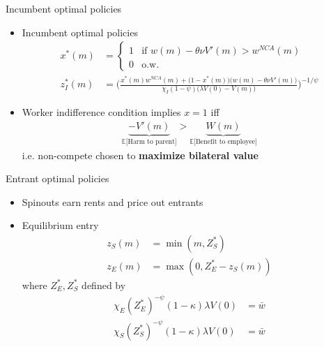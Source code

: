 \documentclass[english,usenames,dvipsnames]{beamer}
\begin{document}
\begin{frame}{Incumbent optimal policies}
\begin{itemize}
\item Incumbent optimal policies
\small
\begin{align*}
x^*(m) &= 
\begin{cases}
1 & \textrm{if } w(m) - \theta \nu V'(m) > w^{NCA}(m) \\
0 & \textrm{o.w.}
\end{cases}\\ 
z_I^*(m) &= \Bigg( \frac{x^*(m) w^{NCA}(m) + \Big(1-x^*(m)\Big) \Big(w(m) - \theta \nu V'(m)\Big)}{\chi_I (1-\psi) \Big(\lambda V(0) - V(m) \Big)} \Bigg)^{-1/\psi} 
\end{align*}
\normalsize
\item Worker indifference condition implies $x = 1$ iff
\begin{align*}
\underbrace{- V'(m)}_{\textrm{$\mathbb{E}$[Harm to parent]}} > \underbrace{W(m)}_{\textrm{$\mathbb{E}$[Benefit to employee]}}  
\end{align*}
i.e. non-compete chosen to \textbf{\alert{maximize bilateral value}}
\end{itemize}
\end{frame}


\begin{frame}{Entrant optimal policies}
\begin{itemize}
\item Spinouts earn rents and price out entrants
\item Equilibrium entry
\begin{align*}
z_S(m) &= \min(m,Z_S^*) \\
z_E(m) &= \max(0, Z_E^* - z_S(m))
\end{align*} 
where $Z_E^*,Z_S^*$ defined by
\begin{align*}
\chi_E (Z_E^*)^{-\psi} (1-\kappa) \lambda V(0) &= \bar{w} \\
\chi_S (Z_S^*)^{-\psi} (1-\kappa) \lambda V(0) &= \bar{w} 
\end{align*}
\end{itemize}
\end{frame}
\end{document}
